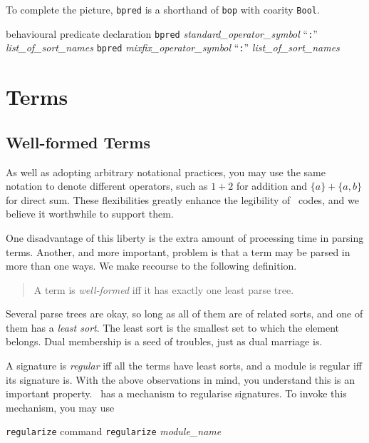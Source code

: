 \documentclass[a4paper]{memoir}
\begin{document}
To complete the picture,
\verb|bpred| is a shorthand of \verb|bop| with coarity \verb|Bool|.

\begin{bsyntax} behavioural predicate declaration  \Hline
\texttt{bpred} \textit{standard\_operator\_symbol} ``\texttt{:}'' \textit{list\_of\_sort\_names}
\texttt{bpred} \textit{mixfix\_operator\_symbol} ``\texttt{:}'' \textit{list\_of\_sort\_names}
\end{bsyntax}

\section{Terms}\label{sec:p2-terms}

\subsection{Well-formed Terms}\label{sec:p2-wff-terms}

As well as adopting arbitrary notational practices, you may
use the same notation to denote different operators, such as
$1 + 2$ for addition and $\{ a \} + \{ a, b \}$ for
direct sum. These flexibilities greatly enhance the
legibility of \cafeobj~codes, and we believe it worthwhile to support
them.

One disadvantage of this liberty is the extra amount of processing time
in parsing terms. Another, and more important, problem is that a term may
be parsed in more than one ways. We make recourse to the following
definition.
\begin{quote}
A term is {\em well-formed} iff it has
exactly one least parse tree.
\end{quote}
Several parse trees are okay, so long as all of them are of
related sorts, and one of them has a {\em least sort}.
The least sort is the smallest set to which the element belongs.
Dual membership is a seed of troubles, just as dual marriage is.

A signature is {\em regular} iff all the
terms have least sorts, and a module is regular iff its signature is.
With the above observations in mind, you understand
this is an important property.
\cafeobj~has a mechanism to regularise signatures. To invoke this
mechanism, you may use

\begin{bsyntax} \texttt{regularize} command  \Hline
\texttt{regularize} \textit{module\_name}
\end{bsyntax}
\end{document}
